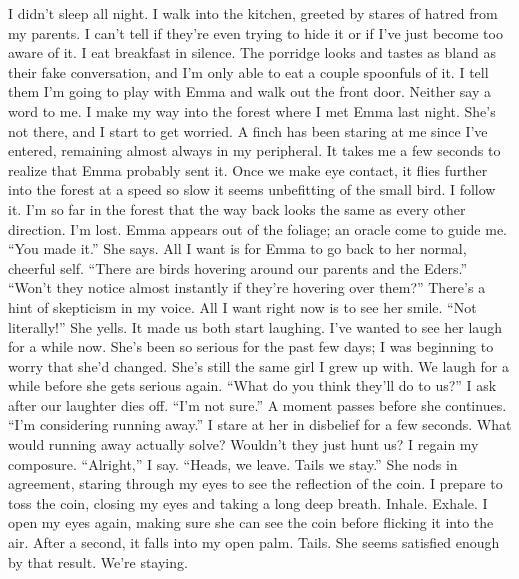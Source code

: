 \documentclass[openany, 12pt]{book}
\newcommand\tab[1][1cm]{\hspace*{#1}}
\begin{document}
I didn’t sleep all night. I walk into the kitchen, greeted by stares of hatred from my parents. I can’t tell if they’re even trying to hide it or if I’ve just become too aware of it. I eat breakfast in silence. The porridge looks and tastes as bland as their fake conversation, and I’m only able to eat a couple spoonfuls of it. I tell them I’m going to play with Emma and walk out the front door. Neither say a word to me. I make my way into the forest where I met Emma last night. She’s not there, and I start to get worried. A finch has been staring at me since I’ve entered, remaining almost always in my peripheral. It takes me a few seconds to realize that Emma probably sent it. Once we make eye contact, it flies further into the forest at a speed so slow it seems unbefitting of the small bird. I follow it. I’m so far in the forest that the way back looks the same as every other direction. I’m lost. Emma appears out of the foliage; an oracle come to guide me. ``You made it.'' She says. All I want is for Emma to go back to her normal, cheerful self. ``There are birds hovering around our parents and the Eders.''
\newline
\tab
``Won’t they notice almost instantly if they’re hovering over them?'' There’s a hint of skepticism in my voice. All I want right now is to see her smile. 
\newline
\tab
``Not literally!'' She yells. It made us both start laughing. I’ve wanted to see her laugh for a while now. She’s been so serious for the past few days; I was beginning to worry that she’d changed. She’s still the same girl I grew up with. 
\newline
\tab
We laugh for a while before she gets serious again. ``What do you think they’ll do to us?'' I ask after our laughter dies off.
\newline
\tab
``I’m not sure.'' A moment passes before she continues. ``I’m considering running away.'' I stare at her in disbelief for a few seconds. What would running away actually solve? Wouldn’t they just hunt us?
\newline
\tab
I regain my composure. ``Alright,'' I say. ``Heads, we leave. Tails we stay.''  She nods in agreement, staring through my eyes to see the reflection of the coin. I prepare to toss the coin, closing my eyes and taking a long deep breath. Inhale. Exhale. I open my eyes again, making sure she can see the coin before flicking it into the air. After a second, it falls into my open palm. Tails. She seems satisfied enough by that result. We’re staying.
\newline
\end{document}
